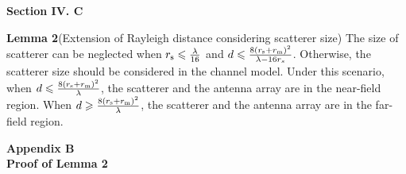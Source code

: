 \documentclass[a4paper,12pt]{article}
\begin{document}
{}
\begin{framed}
    {\bf Section IV. C}

    {\bf Lemma 2}(Extension of Rayleigh distance considering scatterer size)
        The size of scatterer can be neglected when $r_{\rm s} \leqslant \frac{\lambda}{16}$ and {\color{red}$d \leqslant \frac{8(r_{\rm s}+r_{\rm m})^2}{\lambda-16r_s}$}. Otherwise, the scatterer size should be considered in the channel model. Under this scenario, when {\color{red}$d \leqslant \frac{8(r_{\rm s}+r_{\rm m})^2}{\lambda} $}, the scatterer and the antenna array are in the near-field region. When {\color{red}$d \geqslant \frac{8(r_{\rm s}+r_{\rm m})^2}{\lambda}$}, the scatterer and the antenna array are in the far-field region. 

        {\bf Appendix B \\Proof of Lemma 2}


\end{framed}
\end{document}
